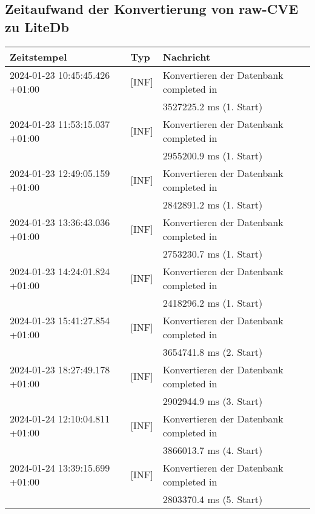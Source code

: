 \subsection{Zeitaufwand der Konvertierung von raw-CVE zu LiteDb} \label{subsec:ZeitaufwandDerKonvertierungVonRaw-CVEZuLiteDb}
    {
        {\small
            \begin{tabularx}{\textwidth}{|l|l|X|}
                \hline
                \textbf{Zeitstempel} & \textbf{Typ} & \textbf{Nachricht} \\
                \hline
                \endhead
                2024-01-23 10:45:45.426 +01:00 & [INF] & Konvertieren der Datenbank completed in \\ & & 3527225.2 ms (1. Start) \\
                2024-01-23 11:53:15.037 +01:00 & [INF] & Konvertieren der Datenbank completed in \\ & & 2955200.9 ms (1. Start) \\
                2024-01-23 12:49:05.159 +01:00 & [INF] & Konvertieren der Datenbank completed in \\ & & 2842891.2 ms (1. Start) \\
                2024-01-23 13:36:43.036 +01:00 & [INF] & Konvertieren der Datenbank completed in \\ & & 2753230.7 ms (1. Start) \\
                2024-01-23 14:24:01.824 +01:00 & [INF] & Konvertieren der Datenbank completed in \\ & & 2418296.2 ms (1. Start) \\
                2024-01-23 15:41:27.854 +01:00 & [INF] & Konvertieren der Datenbank completed in \\ & & 3654741.8 ms (2. Start) \\
                2024-01-23 18:27:49.178 +01:00 & [INF] & Konvertieren der Datenbank completed in \\ & & 2902944.9 ms (3. Start) \\
                2024-01-24 12:10:04.811 +01:00 & [INF] & Konvertieren der Datenbank completed in \\ & & 3866013.7 ms (4. Start) \\
                2024-01-24 13:39:15.699 +01:00 & [INF] & Konvertieren der Datenbank completed in \\ & & 2803370.4 ms (5. Start) \\
                \hline
            \end{tabularx}
        }
    }